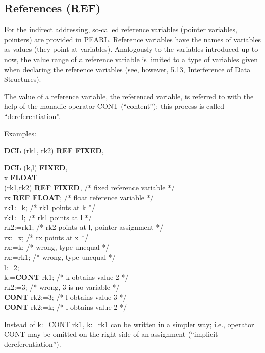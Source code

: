 \begin{tobedone}
\section{References (REF)}  %

For the indirect addressing, so-called reference variables (pointer
variables, pointers) are provided in PEARL. Reference variables have the
names of variables as values (they point at variables). Analogously to
the variables introduced up to now, the value range of a reference
variable is limited to a type of variables given when declaring the
reference variables (see, however, 5.13, Interference of Data
Structures).

The value of a reference variable, the referenced variable, is referred
to with the help of the monadic operator CONT (``content''); this
process is called ``dereferentiation''.

Examples:

\begin{tabbing}
{\bf DCL} (rk1, rk2) {\bf REF FIXED}, \= \kill

{\bf DCL} (k,l) {\bf FIXED}, \> \\
\x        x {\bf FLOAT}      \> \\
\x        (rk1,rk2) {\bf REF FIXED}, \> /* fixed reference variable */ \\
\x        rx {\bf REF FLOAT}; \> /* float reference variable */ \\
rk1:=k;   \> /* rk1 points at k */ \\
rk1:=l;   \> /* rk1 points at l */ \\
rk2:=rk1; \> /* rk2 points at l, pointer assignment */ \\
rx:=x;    \> /* rx points at x */ \\
rx:=k;    \> /* wrong, type unequal */ \\
rx:=rk1;  \> /* wrong, type unequal */ \\
l:=2;     \> \\
k:={\bf CONT} rk1; \> /* k obtains value 2 */ \\
rk2:=3;   \> /* wrong, 3 is no variable */ \\
{\bf CONT} rk2:=3; \> /* l obtains value 3 */ \\
{\bf CONT} rk2:=k; \> /* l obtains value 2 */ \\
\end{tabbing}

Instead of k:=CONT rk1, k:=rk1 can be written in a simpler way; i.e.,
operator CONT may be omitted on the right side of an assignment
(``implicit dereferentiation'').


\end{tobedone}
